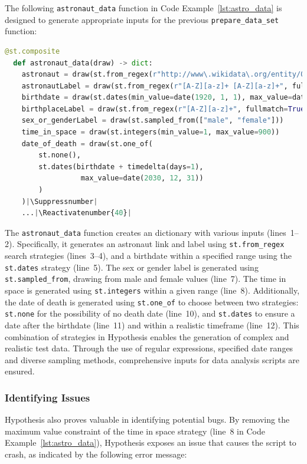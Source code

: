 \documentclass[runningheads]{llncs}
\makeatletter
\let\origthelstnumber\thelstnumber
\newcommand*\Suppressnumber{%
  \lst@AddToHook{OnNewLine}{%
    \let\thelstnumber\relax%
     \advance\c@lstnumber-\@ne\relax%
    }%
}
\newcommand*\Reactivatenumber[1]{%
  \setcounter{lstnumber}{\numexpr#1-1\relax}
  \lst@AddToHook{OnNewLine}{%
   \let\thelstnumber\origthelstnumber%
   \refstepcounter{lstnumber}%
  }%
}
\makeatother
\begin{document}
The following \texttt{astronaut\_data} function in Code Example~\ref{lst:astro_data} is designed to generate appropriate inputs for the previous \texttt{prepare\_data\_set} function:

\begin{lstlisting}[language=Python,caption={Astronaut Data from \texttt{data\_analysis.ipynb}},label=lst:astro_data]
  @st.composite
  def astronaut_data(draw) -> dict:
    astronaut = draw(st.from_regex(r"http://www\.wikidata\.org/entity/Q\d+", fullmatch=True))
    astronautLabel = draw(st.from_regex(r"[A-Z][a-z]+ [A-Z][a-z]+", fullmatch=True))
    birthdate = draw(st.dates(min_value=date(1920, 1, 1), max_value=date(2030, 12, 31)))
    birthplaceLabel = draw(st.from_regex(r"[A-Z][a-z]+", fullmatch=True))
    sex_or_genderLabel = draw(st.sampled_from(["male", "female"]))
    time_in_space = draw(st.integers(min_value=1, max_value=900)) 
    date_of_death = draw(st.one_of(
        st.none(), 
        st.dates(birthdate + timedelta(days=1), 
                  max_value=date(2030, 12, 31))
        )
    )|\Suppressnumber|
    ...|\Reactivatenumber{40}|

\end{lstlisting}
The \texttt{astronaut\_data} function creates an dictionary with various inputs (lines~1--2). Specifically, it generates an astronaut link and label using \texttt{st.from\_regex} search strategies (lines~3--4), and a birthdate within a specified range using the \texttt{st.dates} strategy (line~5). The sex or gender label is generated using \texttt{st.sampled\_from}, drawing from male and female values (line~7). The time in space is generated using \texttt{st.integers} within a given range (line~8). Additionally, the date of death is generated using \texttt{st.one\_of} to choose between two strategies: \texttt{st.none} for the possibility of no death date (line~10), and \texttt{st.dates} to ensure a date after the birthdate (line~11) and within a realistic timeframe (line~12). This combination of strategies in Hypothesis enables the generation of complex and realistic test data. Through the use of regular expressions, specified date ranges and diverse sampling methods, comprehensive inputs for data analysis scripts are ensured.

\subsubsection{Identifying Issues}
Hypothesis also proves valuable in identifying potential bugs. By removing the maximum value constraint of the time in space strategy (line~8 in Code Example~\ref{lst:astro_data}), Hypothesis exposes an issue that causes the script to crash, as indicated by the following error message:
\end{document}
